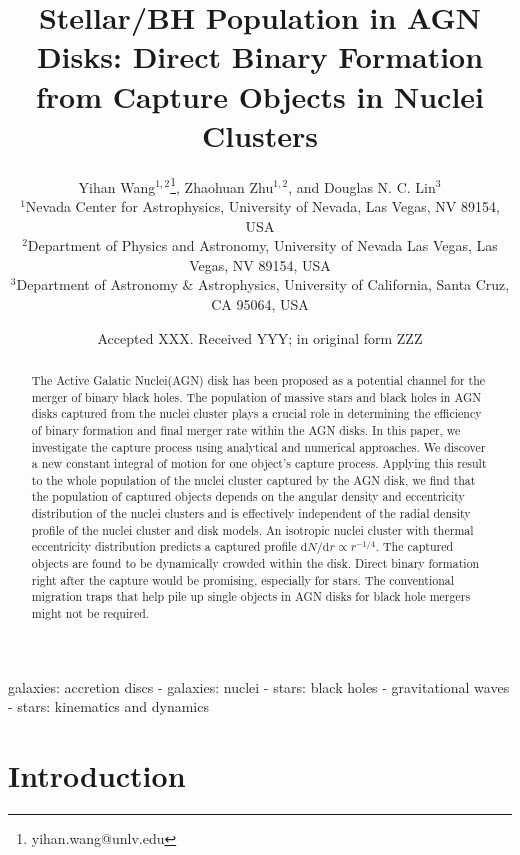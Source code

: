 \documentclass[fleqn,usenatbib]{mnras}
\title[]{Stellar/BH Population in AGN Disks: Direct Binary Formation from Capture Objects in Nuclei Clusters}
\author[]{
Yihan Wang$^{1,2}$\thanks{yihan.wang@unlv.edu},
Zhaohuan Zhu$^{1,2}$, and
Douglas N. C. Lin$^{3}$
\\
$^{1}$Nevada Center for Astrophysics, University of Nevada, Las Vegas, NV 89154, USA\\
$^{2}$Department of Physics and Astronomy, University of Nevada Las Vegas, Las Vegas, NV 89154, USA\\
$^{3}$Department of Astronomy \& Astrophysics, University of California, Santa Cruz, CA 95064, USA
}
\date{Accepted XXX. Received YYY; in original form ZZZ}
\newcommand{\dd}[0]{\mathrm{d}}
\begin{document}
\label{firstpage}
\pagerange{\pageref{firstpage}--\pageref{lastpage}}
\maketitle

\begin{abstract}
The Active Galatic Nuclei(AGN) disk has been proposed as a potential channel for the merger of binary black holes. The population of massive stars and black holes in AGN disks captured from the nuclei cluster plays a crucial role in determining the efficiency of binary formation and final merger rate within the AGN disks. In this paper, we investigate the capture process using analytical and numerical approaches. We discover a new constant integral of motion for one object's capture process. Applying this result to the whole population of the nuclei cluster captured by the AGN disk, we find that the population of captured objects depends on the angular density and eccentricity distribution of the nuclei clusters and is effectively independent of the radial density profile of the nuclei cluster and disk models. An isotropic nuclei cluster with thermal eccentricity distribution predicts a captured profile $\dd N/\dd r\propto r^{-1/4}$. The captured objects are found to be dynamically crowded within the disk. Direct binary formation right after the capture would be promising, especially for stars. The conventional migration traps that help pile up single objects in AGN disks for black hole mergers might not be required. 
\end{abstract}

\begin{keywords}
galaxies: accretion discs - galaxies: nuclei - stars: black holes - gravitational waves - stars: kinematics and dynamics
\end{keywords}



\section{Introduction}
\end{document}

